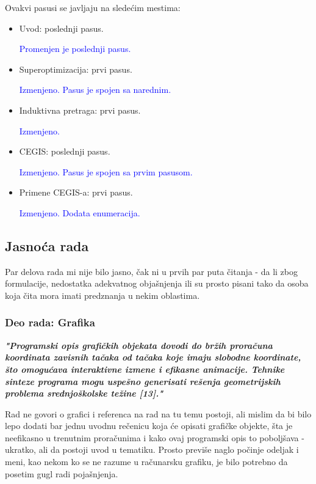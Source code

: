 \documentclass[a4paper]{report}
\newcommand{\odgovor}[1]{\textcolor{blue}{#1}}
\begin{document}
Ovakvi pasusi se javljaju na sledećim mestima:
\begin{itemize}
	\item Uvod: poslednji pasus.

    \odgovor{Promenjen je poslednji pasus.}

    \item Superoptimizacija: prvi pasus.

    \odgovor{Izmenjeno. Pasus je spojen sa narednim.}

    \item Induktivna pretraga: prvi pasus.

    \odgovor{Izmenjeno.}

    \item CEGIS: poslednji pasus.

    \odgovor{Izmenjeno. Pasus je spojen sa prvim pasusom. }

    \item Primene CEGIS-a: prvi pasus.

    \odgovor{Izmenjeno. Dodata enumeracija. }
\end{itemize}


\subsection{Jasnoća rada}

Par delova rada mi nije bilo jasno, čak ni u prvih par puta čitanja - da li zbog formulacije, nedostatka adekvatnog objašnjenja ili su prosto pisani tako da osoba koja čita mora imati predznanja u nekim oblastima.

\subsubsection{Deo rada: Grafika}

\textbf{\textit{"Programski opis grafičkih objekata dovodi do bržih proračuna koordinata zavisnih tačaka od tačaka koje imaju slobodne koordinate, što omogućava interaktivne izmene i efikasne animacije. Tehnike sinteze programa mogu uspešno generisati rešenja geometrijskih problema srednjoškolske težine [13]."}}

Rad ne govori o grafici i referenca na rad na tu temu postoji, ali mislim da bi bilo lepo dodati bar jednu uvodnu rečenicu koja će opisati grafičke objekte, šta je neefikasno u trenutnim proračunima i kako ovaj programski opis to poboljšava - ukratko, ali da postoji uvod u tematiku. Prosto previše naglo počinje odeljak i meni, kao nekom ko se ne razume u računarsku grafiku, je bilo potrebno da posetim gugl radi pojašnjenja.
\end{document}
